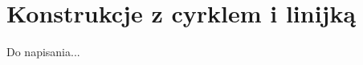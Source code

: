 \documentclass{parchment}
\begin{document}




















\chapter{Konstrukcje z cyrklem i linijką}
Do napisania...

{}


\raggedright
{}
\printindex

\printindex[persons]
\end{document}
